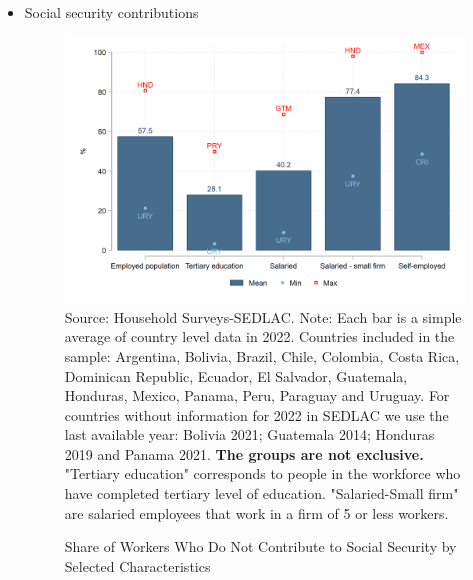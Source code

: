 \documentclass[english]{article}
\begin{document}
\begin{itemize}
        
 \item Social security contributions
    \begin{itemize}
        \begin{figure}[!htb]
        \justifying
        \caption{Share of Workers Who Do Not Contribute to Social Security by Selected Characteristics}     
        \includegraphics[scale=.3]{latex/figures/Snapshot/Social security contributions.png}
        \label{fig:SScontributions}
        \footnotesize{Source: Household Surveys-SEDLAC.}
        \footnotesize{Note: Each bar is a simple average of country level data in 2022. Countries included in the sample: Argentina, Bolivia, Brazil, Chile, Colombia, Costa Rica, Dominican Republic, Ecuador, El Salvador, Guatemala, Honduras, Mexico, Panama, Peru, Paraguay and Uruguay. For countries without information for 2022 in SEDLAC we use the last available year: Bolivia 2021; Guatemala 2014; Honduras 2019 and Panama 2021.
        \textbf{The groups are not exclusive.} "Tertiary education" corresponds to people in the workforce who have completed tertiary level of education. "Salaried-Small firm" are salaried employees that work in a firm of 5 or less workers.}
        \end{figure}



\end{itemize}
\end{itemize}
\end{document}
